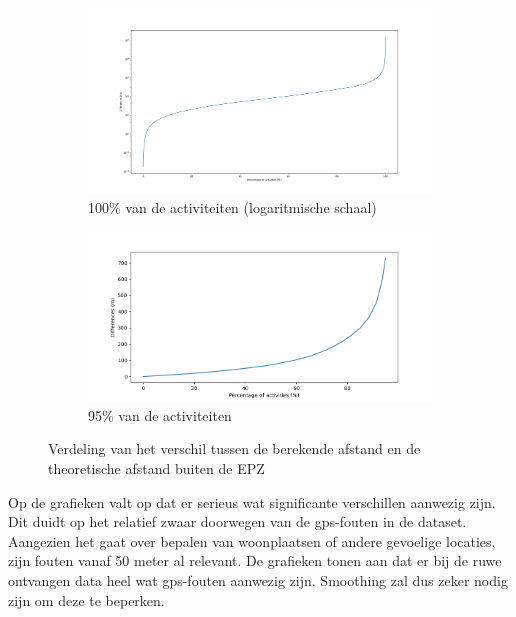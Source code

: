\begin{figure}[h]
    \centering
    \begin{subfigure}{\textwidth}
        \includegraphics[width=\textwidth]{fig/Afwijkingen&Analyses/Graphs/100_Differences_tov_theoretische_BefSmoothening.png}
        \caption{100\% van de activiteiten (logaritmische schaal)}\label{fig:differences_log}
    \end{subfigure}
    \begin{subfigure}[b]{\textwidth}
        \includegraphics[width=\textwidth]{fig/Afwijkingen&Analyses/Graphs/95_Differences_tov_theoretische_BefSmoothening.png}
        \caption{95\% van de activiteiten}\label{fig:differences_nolog}
    \end{subfigure}
    \caption{Verdeling van het verschil tussen de berekende afstand en de theoretische afstand buiten de \ac{EPZ} }\label{fig:differences_theoretical}
\end{figure}

Op de grafieken valt op dat er serieus wat significante verschillen aanwezig
zijn. Dit duidt op het relatief zwaar doorwegen van de \ac{gps}-fouten in de
dataset. Aangezien het gaat over bepalen van woonplaatsen of andere gevoelige
locaties, zijn fouten vanaf 50 meter al relevant. De grafieken tonen aan dat er
bij de ruwe ontvangen data heel wat \ac{gps}-fouten aanwezig zijn. Smoothing
zal dus zeker nodig zijn om deze te beperken.

